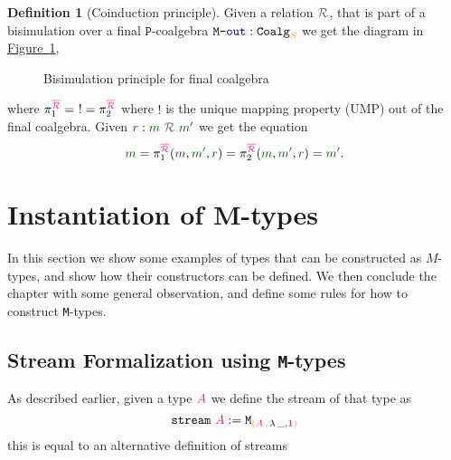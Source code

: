 \documentclass[twoside,11pt,openright]{report}
\theoremstyle{plain} %
\theoremstyle{definition}
\newtheorem{defn}[thm]{Definition}%
\theoremstyle{remark}
\newcommand*{\figref}[1]{\hyperref[fig:#1]{Figure~\ref*{fig:#1}}}
\newcommand*{\term}[1]{\textcolor{green!30!black}{#1}} %
\newcommand*{\type}[1]{\textcolor{magenta!90!black}{#1}}
\newcommand*{\container}[1]{\textcolor{orange}{#1}}
\newcommand*{\containerpair}[2]{\ensuremath{\colorlet{savedleftcolor}{.}\color{orange}\left(\color{savedleftcolor}#1\,\textcolor{orange}{\mathbf{,}}\,#2\color{orange}\right)\color{savedleftcolor}}}
\newcommand*{\unit}{\type{\textbf{1}}}
\newcommand*{\coalg}[2]{#1\texttt{-}#2}
\newcommand*{\relation}[1]{\textcolor{gray!75!black}{\ensuremath{\mathtt{#1}}}}
\newcommand*{\function}[1]{\textcolor{blue!60!black}{\ensuremath{\mathtt{#1}}}}
\newcommand*{\typeformer}[1]{\ensuremath{\mathtt{#1}}}
\newcommand*{\functor}[1]{\ensuremath{\mathbf{\mathtt{#1}}}}
\begin{document}
\begin{defn}[Coinduction principle]
  \noindent Given a relation \(\relation{\mathcal{R}}\), that is part of a bisimulation over a final \(\functor{P}\)-coalgebra \(\coalg{\typeformer{M}}{\function{out}}:\mathtt{Coalg}_{\container{S}}\) we get the diagram in \figref{final-coalgebra-coinduction},
  \begin{figure}[h]
    \centering
    \caption{Bisimulation principle for final coalgebra}
    \label{fig:final-coalgebra-coinduction}
  \end{figure}
  \noindent where \(\pi_1^{\type{\overline{\mathcal{R}}}} = ~! = \pi_2^{\type{\overline{\mathcal{R}}}}\)  where \(!\) is the unique mapping property (UMP) out of the final coalgebra. Given \(\term{r} : \term{m}~\relation{\mathcal{R}}~\term{m'}\) we get the equation
  \begin{equation}
    \term{m} = \pi_1^{\type{\overline{\mathcal{R}}}} (\term{m}, \term{m'}, \term{r}) = \pi_2^{\type{\overline{\mathcal{R}}}} (\term{m}, \term{m'}, \term{r}) = \term{m'}.
  \end{equation}
\end{defn}


\chapter{Instantiation of M-types}
In this section we show some examples of types that can be constructed as \(M\)-types, and show how their constructors can be defined. We then conclude the chapter with some general observation, and define some rules for how to construct \texttt{M}-types. 


\section{Stream Formalization using \texttt{M}-types}
As described earlier, given a type \(\type{A}\) we define the stream of that type as
\begin{equation}
  \typeformer{stream}~\type{A} := \typeformer{M}_{\containerpair{\type{A}}{\lambda\,\_,\unit}}
\end{equation}
this is equal to an alternative definition of streams 
\end{document}
